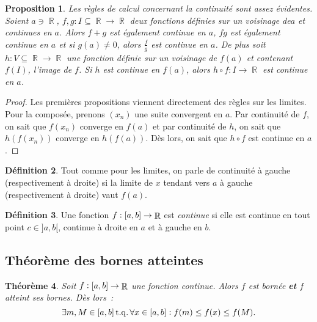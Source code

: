 \documentclass{article}
\DeclareMathOperator{\R}{\mathbb R}
\DeclareMathOperator{\tq}{ t.q. }
\newcommand{\ab}{\interval ab}
\newcommand{\fabr}[1]{#1 : \ab \to \R}
\newtheorem{thm}{Théorème}[section]
\newtheorem{prp}[thm]{Proposition}
\theoremstyle{definition}
\newtheorem{déf}[thm]{Définition}
\theoremstyle{remark}
\begin{document}
		\begin{prp} Les règles de calcul concernant la continuité sont assez évidentes. Soient $a \ni \R$, $f, g : I \subseteq \R \to \R$ deux fonctions
		définies sur un voisinage de$a$ et continues en $a$. Alors $f+g$ est également continue en $a$, $fg$ est également continue en $a$ et si
		$g(a) \neq 0$, alors $\frac fg$ est continue en $a$. De plus soit $h : V \subseteq \R \to \R$ une fonction définie sur un voisinage de $f(a)$
		et contenant $f(I)$, l'image de $f$. Si $h$ est continue en $f(a)$, alors $h \circ f : I \to \R$ est continue en $a$. \end{prp}

		\begin{proof} Les premières propositions viennent directement des règles sur les limites. Pour la composée, prenons $(x_n)$ une suite convergent en $a$.
		Par continuité de $f$, on sait que $f(x_n)$ converge en $f(a)$ et par continuité de $h$, on sait que $h(f(x_n))$ converge en $h(f(a))$. Dès lors, on sait que
		$h \circ f$ est continue en $a$. \end{proof}

		\begin{déf} Tout comme pour les limites, on parle de continuité à gauche (respectivement à droite) si la limite de $x$ tendant vers $a$ à gauche
		(respectivement à droite) vaut $f(a)$. \end{déf}

		\begin{déf} Une fonction $\fabr f$ est \textit{continue} si elle est continue en tout point $c \in ]a, b[$, continue à droite en
		$a$ et à gauche en $b$. \end{déf}

	\subsection{Théorème des bornes atteintes}

		\begin{thm} Soit $\fabr f$ une fonction continue. Alors $f$ est bornée \textbf{et} $f$ atteint ses bornes. Dès lors~:
		\[\exists m, M \in \ab \tq \forall x \in \ab : f(m) \leq f(x) \leq f(M).\]
		\end{thm}
\end{document}
